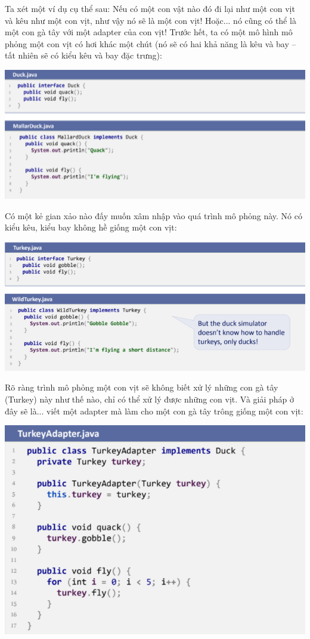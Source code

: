 Ta xét một ví dụ cụ thể sau: Nếu có một con vật nào đó đi lại như một con vịt và kêu như một con vịt, như vậy nó sẽ là một con vịt! Hoặc... nó cũng có thể là một con gà tây với một adapter của con vịt!
Trước hết, ta có một mô hình mô phỏng một con vịt có hơi khác một chút (nó sẽ có hai khả năng là kêu và bay – tất nhiên sẽ có kiểu kêu và bay đặc trưng):\\
\begin{center}
\includegraphics{GALLEYS/images/chapter6/code1}\\
\end{center}
Có một kẻ gian xảo nào đấy muốn xâm nhập vào quá trình mô phỏng này. Nó có kiểu kêu, kiểu bay không hề giống một con vịt:
\begin{center}
\includegraphics{GALLEYS/images/chapter6/code2}\\
\end{center}
Rõ ràng trình mô phỏng một con vịt sẽ không biết xử lý những con gà tây (Turkey) này như thế nào, chỉ có thể xử lý được những con vịt. Và giải pháp ở đây sẽ là... viết một adapter mà làm cho một con gà tây trông giống một con vịt:
\begin{center}
\includegraphics{GALLEYS/images/chapter6/code3}
\end{center}
